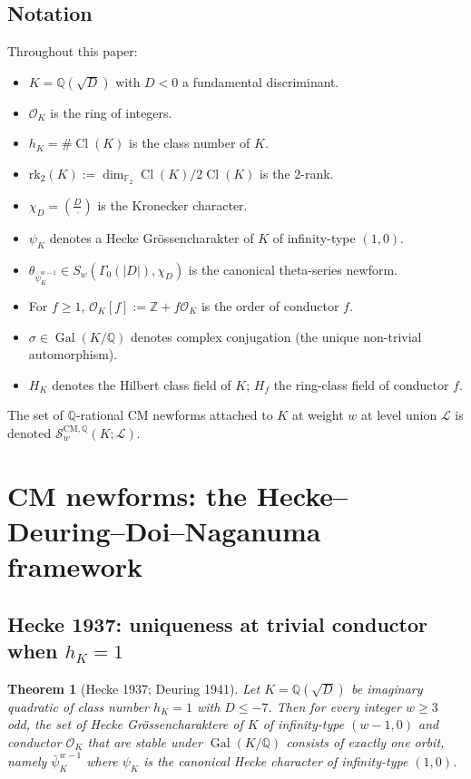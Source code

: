 \documentclass[11pt,a4paper]{amsart}
\newtheorem{theorem}{Theorem}[section]
\theoremstyle{definition}
\DeclareMathOperator{\Gal}{Gal}
\DeclareMathOperator{\Cl}{Cl}
\newcommand{\Q}{\mathbb{Q}}
\newcommand{\Z}{\mathbb{Z}}
\newcommand{\F}{\mathbb{F}}
\newcommand{\OK}{\mathcal{O}_K}
\newcommand{\Lcal}{\mathcal{L}}
\newcommand{\Scal}{\mathcal{S}}
\newcommand{\hK}{h_{K}}
\newcommand{\rktwo}{\mathrm{rk}_2}
\begin{document}
\subsection{Notation}\label{sec:notation}

Throughout this paper:
\begin{itemize}[leftmargin=2em]
  \item $K = \Q(\sqrt{D})$ with $D < 0$ a fundamental discriminant.
  \item $\OK$ is the ring of integers.
  \item $\hK = \#\Cl(K)$ is the class number of $K$.
  \item $\rktwo(K) := \dim_{\F_2} \Cl(K)/2\Cl(K)$ is the $2$-rank.
  \item $\chi_D = \left(\frac{D}{\cdot}\right)$ is the Kronecker character.
  \item $\psi_K$ denotes a Hecke Gr\"ossencharakter of $K$ of infinity-type $(1, 0)$.
  \item $\theta_{\bar\psi_K^{w-1}} \in S_w(\Gamma_0(|D|), \chi_D)$ is the canonical theta-series newform.
  \item For $f \ge 1$, $\OK[f] := \Z + f \OK$ is the order of conductor $f$.
  \item $\sigma \in \Gal(K/\Q)$ denotes complex conjugation (the unique non-trivial automorphism).
  \item $H_K$ denotes the Hilbert class field of $K$; $H_f$ the ring-class field of conductor $f$.
\end{itemize}

The set of $\Q$-rational CM newforms attached to $K$ at weight $w$ at level union $\Lcal$ is denoted $\Scal_w^{\mathrm{CM}, \Q}(K; \Lcal)$.


\section{CM newforms: the Hecke--Deuring--Doi--Naganuma framework}\label{sec:CMframework}

\subsection{Hecke 1937: uniqueness at trivial conductor when $h_K = 1$}\label{sec:hecke-uniqueness}

\begin{theorem}[Hecke 1937; Deuring 1941]\label{thm:hecke-unique}
Let $K = \Q(\sqrt{D})$ be imaginary quadratic of class number $\hK = 1$ with $D \le -7$. Then for every integer $w \ge 3$ odd, the set of Hecke Gr\"ossencharaktere of $K$ of infinity-type $(w-1, 0)$ and conductor $\OK$ that are stable under $\Gal(K/\Q)$ consists of exactly one orbit, namely $\bar\psi_K^{w-1}$ where $\psi_K$ is the canonical Hecke character of infinity-type $(1, 0)$.
\end{theorem}
\end{document}
